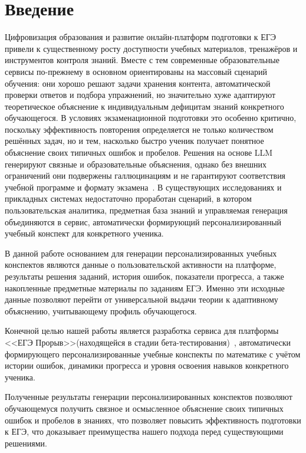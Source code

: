 \documentclass[a4paper,12pt]{extarticle}
\begin{document}
\section*{Введение}
Цифровизация образования и развитие онлайн-платформ подготовки к ЕГЭ привели к 
существенному росту доступности
учебных материалов, тренажёров и инструментов контроля знаний. Вместе с тем
современные образовательные сервисы по-прежнему в основном ориентированы на
массовый сценарий обучения: они хорошо решают задачи хранения контента,
автоматической проверки ответов и подбора упражнений, но значительно хуже
адаптируют теоретическое объяснение к индивидуальным дефицитам знаний
конкретного обучающегося. В условиях экзаменационной подготовки это особенно
критично, поскольку эффективность повторения определяется не только количеством
решённых задач, но и тем, насколько быстро ученик получает понятное объяснение
своих типичных ошибок и пробелов. Решения на основе LLM генерируют связные и 
образовательные объяснения, однако без внешних ограничений они
подвержены галлюцинациям и не гарантируют соответствия учебной программе
и формату экзамена~\cite{kasneci2023chatgpt,yan2024challenges,shi2025llmedu}.
В существующих исследованиях и прикладных системах
недостаточно проработан сценарий, в котором пользовательская аналитика,
предметная база знаний и управляемая генерация объединяются в сервис,
автоматически формирующий персонализированный учебный конспект для
конкретного ученика.

В данной работе основанием для генерации персонализированных учебных конспектов
являются данные о пользовательской активности на платформе, результаты решения
заданий, история ошибок, показатели прогресса, а также накопленные предметные
материалы по заданиям ЕГЭ. Именно эти исходные данные позволяют перейти от
универсальной выдачи теории к адаптивному объяснению, учитывающему профиль
обучающегося.

Конечной целью нашей работы является разработка сервиса для
платформы <<ЕГЭ Прорыв>>(находящейся в стадии 
бета-тестирования)~\cite{exambreakout2026}, автоматически формирующего
персонализированные учебные конспекты по математике с учётом истории ошибок,
динамики прогресса и уровня освоения навыков конкретного ученика.

Полученные результаты генерации персонализированных конспектов позволяют обучающемуся получить
связное и осмысленное объяснение своих типичных ошибок и пробелов в знаниях, что позволяет
повысить эффективность подготовки к ЕГЭ, что доказывает преимущества нашего подхода перед
существующими решениями.
\end{document}

